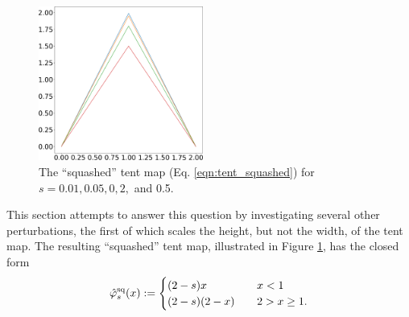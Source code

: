 \begin{figure}
    \centering
    \includegraphics[width=0.48\textwidth]{squashed_tent_map.png}
    \caption{The ``squashed'' tent map (Eq. \ref{eqn:tent_squashed}) for $s=0.01, 0.05, 0,2,$ and 0.5.}
    \label{fig:tent_squashed}
\end{figure}

This section attempts to answer this question by investigating several other
perturbations, the first of which scales the height, but not the width,
of the tent map.  The resulting ``squashed'' tent map, illustrated
in Figure \ref{fig:tent_squashed}, has the closed form 
\begin{equation} \label{eqn:tent_squashed}
\hat{\varphi}^{\rm sq}_s(x) := \begin{cases}
    (2-s)x \quad & x < 1 \\
    (2-s)(2 - x) \quad & 2 >  x \ge 1.
    \end{cases}
\end{equation}


